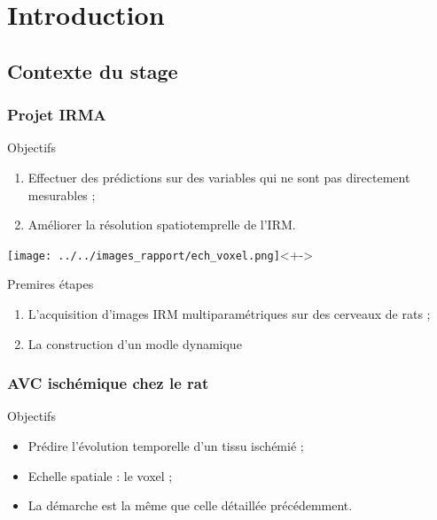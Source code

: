\section{Introduction}

\subsection{Contexte du stage}

\subsubsection{Projet IRMA}

\begin{frame}
\begin{block}{Objectifs}
\begin{enumerate}
\item<+-> Effectuer des pr\'edictions sur des variables qui ne sont pas directement mesurables ;
\item<+-> Am\'eliorer la r\'esolution spatiotemprelle de l'IRM.
\end{enumerate}
\end{block}
\texttt{[image: ../../images\_rapport/ech\_voxel.png]}<+->
\end{frame}

\begin{frame}
\begin{block}{Premires \'etapes}
\begin{enumerate}
\item<+-> L'acquisition d'images IRM multiparam\'etriques sur des cerveaux de rats ;
\item<+-> La construction d'un modle dynamique 
\end{enumerate}
\end{block}
\end{frame}

\subsubsection{AVC isch\'emique chez le rat}

\begin{frame}{Objectifs}
\begin{itemize}
\item<+-> Pr\'edire l'\'evolution temporelle d'un tissu isch\'emi\'e ;
\item<+-> Echelle spatiale : le voxel ;
\item<+-> La d\'emarche est la m\^eme que celle d\'etaill\'ee pr\'ec\'edemment.
\end{itemize}
\end{frame}




